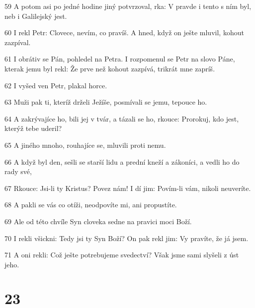 \par 59 A potom asi po jedné hodine jiný potvrzoval, rka: V pravde i tento s ním byl, neb i Galilejský jest.
\par 60 I rekl Petr: Clovece, nevím, co pravíš. A hned, když on ješte mluvil, kohout zazpíval.
\par 61 I obrátiv se Pán, pohledel na Petra. I rozpomenul se Petr na slovo Páne, kterak jemu byl rekl: Že prve než kohout zazpívá, trikrát mne zapríš.
\par 62 I vyšed ven Petr, plakal horce.
\par 63 Muži pak ti, kteríž drželi Ježíše, posmívali se jemu, tepouce ho.
\par 64 A zakrývajíce ho, bili jej v tvár, a tázali se ho, rkouce: Prorokuj, kdo jest, kterýž tebe uderil?
\par 65 A jiného mnoho, rouhajíce se, mluvili proti nemu.
\par 66 A když byl den, sešli se starší lidu a prední kneží a zákoníci, a vedli ho do rady své,
\par 67 Rkouce: Jsi-li ty Kristus? Povez nám! I dí jim: Povím-li vám, nikoli neuveríte.
\par 68 A pakli se vás co otíži, neodpovíte mi, ani propustíte.
\par 69 Ale od této chvíle Syn cloveka sedne na pravici moci Boží.
\par 70 I rekli všickni: Tedy jsi ty Syn Boží? On pak rekl jim: Vy pravíte, že já jsem.
\par 71 A oni rekli: Což ješte potrebujeme svedectví? Však jsme sami slyšeli z úst jeho.

\chapter{23}

